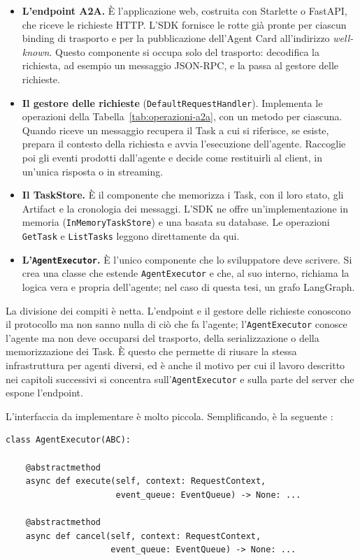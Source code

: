 \begin{itemize}
    \item \textbf{L'endpoint A2A.} È l'applicazione web, costruita con Starlette o FastAPI, che riceve le richieste HTTP. L'SDK fornisce le rotte già pronte per ciascun binding di trasporto e per la pubblicazione dell'Agent Card all'indirizzo \emph{well-known}. Questo componente si occupa solo del trasporto: decodifica la richiesta, ad esempio un messaggio JSON-RPC, e la passa al gestore delle richieste.
    \item \textbf{Il gestore delle richieste} (\texttt{DefaultRequestHandler}). Implementa le operazioni della Tabella~\ref{tab:operazioni-a2a}, con un metodo per ciascuna. Quando riceve un messaggio recupera il Task a cui si riferisce, se esiste, prepara il contesto della richiesta e avvia l'esecuzione dell'agente. Raccoglie poi gli eventi prodotti dall'agente e decide come restituirli al client, in un'unica risposta o in streaming.
    \item \textbf{Il TaskStore.} È il componente che memorizza i Task, con il loro stato, gli Artifact e la cronologia dei messaggi. L'SDK ne offre un'implementazione in memoria (\texttt{InMemoryTaskStore}) e una basata su database. Le operazioni \texttt{GetTask} e \texttt{ListTasks} leggono direttamente da qui.
    \item \textbf{L'\texttt{AgentExecutor}.} È l'unico componente che lo sviluppatore deve scrivere. Si crea una classe che estende \texttt{AgentExecutor} e che, al suo interno, richiama la logica vera e propria dell'agente; nel caso di questa tesi, un grafo LangGraph.
\end{itemize}

La divisione dei compiti è netta. L'endpoint e il gestore delle richieste conoscono il protocollo ma non sanno nulla di ciò che fa l'agente; l'\texttt{AgentExecutor} conosce l'agente ma non deve occuparsi del trasporto, della serializzazione o della memorizzazione dei Task. È questo che permette di riusare la stessa infrastruttura per agenti diversi, ed è anche il motivo per cui il lavoro descritto nei capitoli successivi si concentra sull'\texttt{AgentExecutor} e sulla parte del server che espone l'endpoint.

L'interfaccia da implementare è molto piccola. Semplificando, è la seguente \cite{a2apythondocs}:

\begin{center}
\begin{minipage}{0.95\linewidth}
\footnotesize
\begin{verbatim}
class AgentExecutor(ABC):

    @abstractmethod
    async def execute(self, context: RequestContext,
                      event_queue: EventQueue) -> None: ...

    @abstractmethod
    async def cancel(self, context: RequestContext,
                     event_queue: EventQueue) -> None: ...
\end{verbatim}
\end{minipage}
\end{center}

